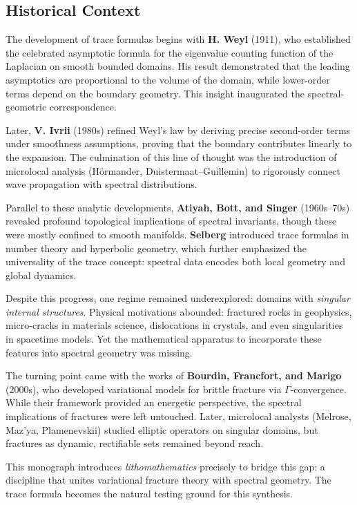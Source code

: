 \subsection*{Historical Context}

The development of trace formulas begins with \textbf{H. Weyl} (1911), who established the celebrated asymptotic formula for the eigenvalue counting function of the Laplacian on smooth bounded domains. His result demonstrated that the leading asymptotics are proportional to the volume of the domain, while lower-order terms depend on the boundary geometry. This insight inaugurated the spectral-geometric correspondence.

Later, \textbf{V. Ivrii} (1980s) refined Weyl’s law by deriving precise second-order terms under smoothness assumptions, proving that the boundary contributes linearly to the expansion. The culmination of this line of thought was the introduction of microlocal analysis (Hörmander, Duistermaat–Guillemin) to rigorously connect wave propagation with spectral distributions.

Parallel to these analytic developments, \textbf{Atiyah, Bott, and Singer} (1960s–70s) revealed profound topological implications of spectral invariants, though these were mostly confined to smooth manifolds. \textbf{Selberg} introduced trace formulas in number theory and hyperbolic geometry, which further emphasized the universality of the trace concept: spectral data encodes both local geometry and global dynamics.

Despite this progress, one regime remained underexplored: domains with \emph{singular internal structures}. Physical motivations abounded: fractured rocks in geophysics, micro-cracks in materials science, dislocations in crystals, and even singularities in spacetime models. Yet the mathematical apparatus to incorporate these features into spectral geometry was missing.

The turning point came with the works of \textbf{Bourdin, Francfort, and Marigo} (2000s), who developed variational models for brittle fracture via $\Gamma$-convergence. While their framework provided an energetic perspective, the spectral implications of fractures were left untouched. Later, microlocal analysts (Melrose, Maz’ya, Plamenevskii) studied elliptic operators on singular domains, but fractures as dynamic, rectifiable sets remained beyond reach.

This monograph introduces \emph{lithomathematics} precisely to bridge this gap: a discipline that unites variational fracture theory with spectral geometry. The trace formula becomes the natural testing ground for this synthesis.

